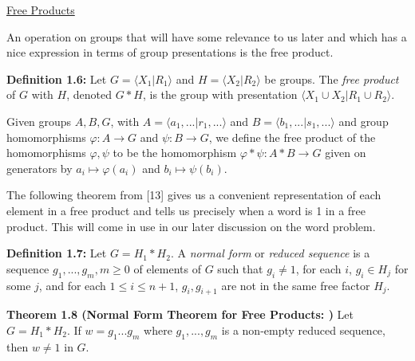 \documentclass[12pt]{article}
\newcommand{\vs}{\vskip10pt}
\begin{document}
	\vs 
	
	\underline{Free Products}
	
	\vs
	
	An operation on groups that will have some relevance to us later and which has a nice expression in terms of group presentations is the free product. 
	
	\vs 
	
	\textbf{Definition 1.6: } Let $G = \langle X_1 \vert R_1 \rangle$ and $H = \langle X_2 \vert R_2 \rangle$ be groups. The \textit{free product} of $G$ with $H$, denoted $G*H$, is the group with presentation $\langle X_1 \cup X_2 \vert R_1 \cup R_2 \rangle$. 
	
	\vs 
	
	Given groups $A,B,G$, with $A = \langle a_1,... \vert r_1,... \rangle$ and $B = \langle b_1,... \vert s_1,... \rangle$ and group homomorphisms $\varphi: A \rightarrow G$ and $\psi: B \rightarrow G$, we define the free product of the homomorphisms $\varphi, \psi$ to be the homomorphism $\varphi * \psi: A * B \rightarrow G$ given on generators by $a_i \mapsto \varphi(a_i)$ and $b_i \mapsto \psi(b_i)$. 
	
	\vs 
	
	The following theorem from [13] gives us a convenient representation of each element in a free product and tells us precisely when a word is 1 in a free product. This will come in use in our later discussion on the word problem. 
	
	\vs 
	
	\textbf{Definition 1.7: } Let $G = H_1 * H_2$. A \textit{normal form} or \textit{reduced sequence} is a sequence $g_1,...,g_m, m \geq 0$ of elements of $G$ such that $g_i \neq 1$, for each $i$, $g_i \in H_j$ for some $j$, and for each $1 \leq i \leq n+1$, $g_i, g_{i+1}$ are not in the same free factor $H_j$. 
	
	\vs
	
	\textbf{Theorem 1.8 (Normal Form Theorem for Free Products: )} Let $G = H_1 * H_2$. If $w = g_1...g_m$ where $g_1,...,g_m$ is a non-empty reduced sequence, then $w \neq 1$ in $G$. 
	
\end{document}
